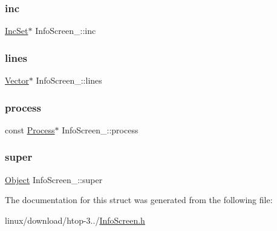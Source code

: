 \mbox{\label{structInfoScreen___a20a3a5afb469b3c3f37bedca88845b39}} 
\subsubsection{\texorpdfstring{inc}{inc}}
{\footnotesize\ttfamily \hyperlink{IncSet_8h_a5a093913f0cffb0939e9000ae05e6604}{Inc\+Set}$\ast$ Info\+Screen\+\_\+\+::inc}

\mbox{\label{structInfoScreen___acba1bc153c2fe9cc721f9850887a4eae}} 
\subsubsection{\texorpdfstring{lines}{lines}}
{\footnotesize\ttfamily \hyperlink{Vector_8h_a8297b82ce917cd21838596b7e3a7faa8}{Vector}$\ast$ Info\+Screen\+\_\+\+::lines}

\mbox{\label{structInfoScreen___a7520e11621ed0404ad6cc18d74381117}} 
\subsubsection{\texorpdfstring{process}{process}}
{\footnotesize\ttfamily const \hyperlink{Process_8h_a20673e8fa40981a168bf0e196c4cef3b}{Process}$\ast$ Info\+Screen\+\_\+\+::process}

\mbox{\label{structInfoScreen___a82e56554b0dd9bca2664e9facc374c5c}} 
\subsubsection{\texorpdfstring{super}{super}}
{\footnotesize\ttfamily \hyperlink{Object_8h_a32b67ad7134cd31b5ec5ed9c6a2d3978}{Object} Info\+Screen\+\_\+\+::super}



The documentation for this struct was generated from the following file\+:\begin{DoxyCompactItemize}
\item 
linux/download/htop-\/3../\hyperlink{InfoScreen_8h}{Info\+Screen.\+h}\end{DoxyCompactItemize}
